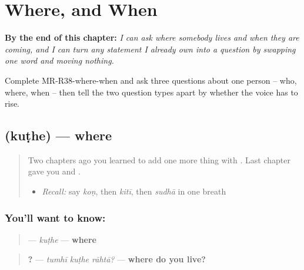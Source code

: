 
\chapter{Where, and When}
\label{ch:mr-where-when}

\begin{chapteropening}
\textbf{By the end of this chapter:} \emph{I can ask where somebody lives and when they are coming, and I can turn any statement I already own into a question by swapping one word and moving nothing.}

Complete MR-R38-where-when and ask three questions about one person -- who, where, when -- then tell the two question types apart by whether the voice has to rise.
\end{chapteropening}

\section[\texorpdfstring{\mr{कुठे} (kuṭhe)}{कुठे (kuṭhe)}]{ (kuṭhe) — where}

\label{lesson:MR-C38-kuthe}



\begin{quote}
Two chapters ago you learned to add one more thing with \textbf{}. Last chapter gave you \textbf{} and \textbf{}.

\begin{itemize}
\raggedright
  \item \emph{Recall:} say \emph{koṇ}, then \emph{kitī}, then \emph{sudhā} in one breath
\end{itemize}
\end{quote}

\subsection*{You'll want to know: }
\begin{quote}
\textbf{} — \emph{kuṭhe} — \textbf{where}
\end{quote}

\begin{quote}
\textbf{  ?} — \emph{tumhī kuṭhe rāhtā?} — \textbf{where do you live?}
\end{quote}

